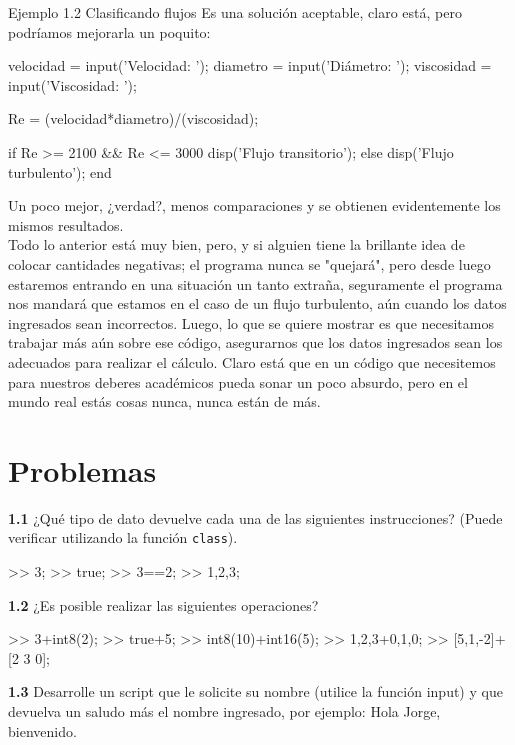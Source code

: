 \begin{ejemplo}{Ejemplo 1.2 Clasificando flujos}
Es una solución aceptable, claro está, pero podríamos mejorarla un poquito:

\begin{matlab}
velocidad = input('Velocidad: ');
diametro = input('Diámetro: ');
viscosidad = input('Viscosidad: ');

Re = (velocidad*diametro)/(viscosidad);

if Re >= 2100 && Re <= 3000
   disp('Flujo transitorio');
else
   disp('Flujo turbulento');
end
\end{matlab}

Un poco mejor, ¿verdad?, menos comparaciones y se obtienen evidentemente los mismos 
resultados.\\

Todo lo anterior está muy bien, pero, y si alguien tiene la brillante idea de colocar 
cantidades negativas; el programa nunca se "quejará", pero desde luego estaremos 
entrando en una situación un tanto extraña, seguramente el programa nos mandará que 
estamos en el caso de un flujo turbulento, aún cuando los datos ingresados sean incorrectos.
Luego, lo que se quiere mostrar es que necesitamos trabajar más aún sobre ese código, 
asegurarnos que los datos ingresados sean los adecuados para realizar el cálculo. 
Claro está que en un código que necesitemos para nuestros deberes académicos pueda 
sonar un poco absurdo, pero en el mundo real estás cosas nunca, nunca están de más.
\end{ejemplo}

\section*{Problemas}

\textbf{1.1} ¿Qué tipo de dato devuelve cada una de las siguientes
instrucciones? (Puede verificar utilizando la función \texttt{class}).

\begin{matlab}
>> 3;
>> true;
>> 3==2;
>> {1,2,3}; 
\end{matlab}

\textbf{1.2} ¿Es posible realizar las siguientes operaciones?

\begin{matlab}
>> 3+int8(2);
>> true+5;
>> int8(10)+int16(5);
>> {1,2,3}+{0,1,0};
>> [5,1,-2]+[2 3 0];
\end{matlab}

\textbf{1.3} Desarrolle un script que le solicite su nombre (utilice la
función input) y que devuelva un saludo más el nombre ingresado, por
ejemplo: Hola Jorge, bienvenido. \\

